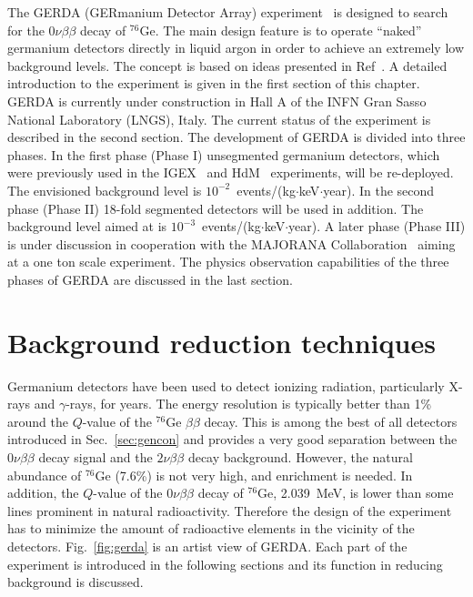 The GERDA (GERmanium Detector Array) experiment~\cite{Abt04, Sch05} is designed to search for the $0\nu\beta\beta$ decay of $^{76}$Ge. The main design feature is to operate ``naked'' germanium detectors directly in liquid argon in order to achieve an extremely low background levels. The concept is based on ideas presented in Ref~\cite{Heu95}. A detailed introduction to the experiment is given in the first section of this chapter. GERDA is currently under construction in Hall A of the INFN Gran Sasso National Laboratory (LNGS), Italy. The current status of the experiment is described in the second section. The development of GERDA is divided into three phases. In the first phase (Phase I) unsegmented germanium detectors, which were previously used in the IGEX~\cite{Aal02} and HdM~\cite{Hei04} experiments, will be re-deployed. The envisioned background level is $10^{-2}$~events/(kg$\cdot$keV$\cdot$year). In the second phase (Phase II) 18-fold segmented detectors will be used in addition. The background level aimed at is $10^{-3}$~events/(kg$\cdot$keV$\cdot$year). A later phase (Phase III) is under discussion in cooperation with the MAJORANA Collaboration~\cite{Gai03,Aal04} aiming at a one ton scale experiment. The physics observation capabilities of the three phases of GERDA are discussed in the last section.

\section{Background reduction techniques}
\label{sec:gerda:conc}
Germanium detectors have been used to detect ionizing radiation, particularly X-rays and $\gamma$-rays, for years. The energy resolution is typically better than 1\% around the $Q$-value of the $^{76}$Ge $\beta\beta$ decay. This is among the best of all detectors introduced in Sec.~\ref{sec:gencon} and provides a very good separation between the $0\nu\beta\beta$ decay signal and the $2\nu\beta\beta$ decay background. However, the natural abundance of $^{76}$Ge (7.6\%) is not very high, and enrichment is needed. In addition, the $Q$-value of the $0\nu\beta\beta$ decay of $^{76}$Ge, 2.039~MeV, is lower than some lines prominent in natural radioactivity. Therefore the design of the experiment has to minimize the amount of radioactive elements in the vicinity of the detectors. Fig.~\ref{fig:gerda} is an artist view of GERDA. Each part of the experiment is introduced in the following sections and its function in reducing background is discussed.

